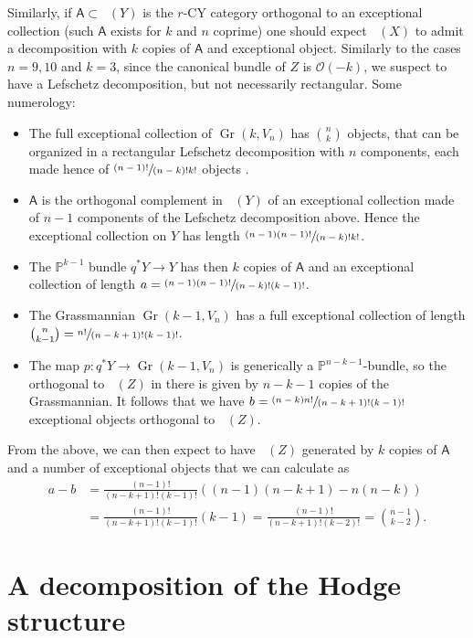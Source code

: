 \documentclass[11pt]{article}
\let\mathcal\mathscr
\theoremstyle{plain}
\theoremstyle{definition}
\newcommand{\cat}[1]{\mathsf{#1}}
\DeclareMathOperator{\Db}{{\cat{D}^{\mathrm{b}}}}
\DeclareMathOperator{\Gr}{Gr}
\newcommand{\PP}{\mathbb{P}}
\newcommand{\sheaf}[1]{\mathcal{#1}}
\newcommand{\ko}{\sheaf{O}}\let\OO\ko\let\cO\ko
\begin{document}
Similarly, if $\cat{A} \subset \Db(Y)$ is the $r$-CY category orthogonal to an
exceptional collection (such $\cat{A}$ exists for $k$ and $n$ coprime) one should
expect $\Db(X)$ to admit a decomposition with $k$ copies of $\cat{A}$ and exceptional
object. Similarly to the cases $n=9,10$ and $k=3$, since the canonical bundle of $Z$
is $\ko(-k)$, we suspect to have a Lefschetz decomposition, but not necessarily
rectangular. Some numerology:

\begin{itemize}
\item The full exceptional collection of $\Gr(k,V_n)$ has $\binom{n}{k}$ objects,
that can be organized in a rectangular Lefschetz decomposition with $n$ components, each made
hence of $\sfrac{(n-1)!}{(n-k)!k!}$ objects \cite[Cor.\,4.4]{kuz-fractional}.
\item $\cat{A}$ is the orthogonal complement in $\Db(Y)$ of an exceptional collection
made of $n-1$ components of the Lefschetz decomposition above. Hence the exceptional collection
on $Y$ has length $\sfrac{(n-1)(n-1)!}{(n-k)!k!}$.
\item The $\PP^{k-1}$ bundle $q^*Y \to Y$ has then $k$ copies of $\cat{A}$ and an exceptional
collection of length $a=\sfrac{(n-1)(n-1)!}{(n-k)!(k-1)!}$.
\item The Grassmannian $\Gr(k-1,V_n)$ has a full exceptional collection of length
$\binom{n}{k-1}=\sfrac{n!}{(n-k+1)!(k-1)!}$.
\item The map $p:q^*Y \to \Gr(k-1,V_n)$ is generically a $\PP^{n-k-1}$-bundle, so
the orthogonal to $\Db(Z)$ in there is given by $n-k-1$ copies of the Grassmannian. It
follows that we have $b=\sfrac{(n-k)n!}{(n-k+1)!(k-1)!}$ exceptional objects orthogonal
to $\Db(Z)$.
\end{itemize}

From the above, we can then expect to have $\Db(Z)$ generated by $k$ copies of $\cat{A}$
and a number of exceptional objects that we can calculate as
\begin{align*}
a-b&=\frac{(n-1)!}{(n-k+1)!(k-1)!}((n-1)(n-k+1)-n(n-k))\\[-2pt]
&=\frac{(n-1)!}{(n-k+1)!(k-1)!}(k-1)= \frac{(n-1)!}{(n-k+1)!(k-2)!} = \binom{n-1}{k-2}.
\end{align*}
\appendix

\section{A decomposition of the Hodge structure}\label{sec:hodgedeco}
\end{document}
